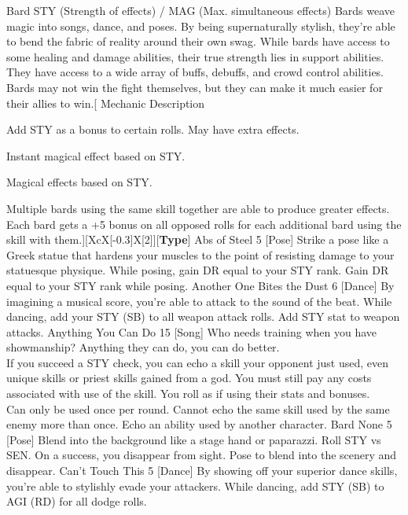 ﻿\begin{path}
{Bard}
{STY (Strength of effects) / MAG (Max. simultaneous effects)}
{Bards weave magic into songs, dance, and poses. By being supernaturally stylish, they're able to bend the fabric of reality around their own swag.}
{While bards have access to some healing and damage abilities, their true strength lies in support abilities. They have access to a wide array of buffs, debuffs, and crowd control abilities. Bards may not win the fight themselves, but they can make it much easier for their allies to win.}[
Mechanic Description
\begin{wldescription}
\item [Dance:]  Add STY as a bonus to certain rolls. May have extra effects.
\item [Pose:]  Instant magical effect based on STY.
\item [Song:]  Magical effects based on STY.
\end{wldescription}
Multiple bards using the same skill together are able to produce greater effects. Each bard gets a +5 bonus on all opposed rolls for each additional bard using the skill with them.][XcX[-0.3]X[2]][\textbf{Type}]
\skilldescription
{Abs of Steel}
{5}
[Pose]
{Strike a pose like a Greek statue that hardens your muscles to the point of resisting damage to your statuesque physique. While posing, gain DR equal to your STY rank.}
{Gain DR equal to your STY rank while posing.}
\skilldescription
{Another One Bites the Dust}
{6}
[Dance]
{By imagining a musical score, you're able to attack to the sound of the beat. While dancing, add your STY (SB) to all weapon attack rolls.}
{Add STY stat to weapon attacks.}
\skilldescription
{Anything You Can Do}
{15}
[Song]
{Who needs training when you have showmanship? Anything they can do, you can do better.
\\If you succeed a STY check, you can echo a skill your opponent just used, even unique skills or priest skills gained from a god. You must still pay any costs associated with use of the skill. You roll as if using their stats and bonuses.
\\Can only be used once per round. Cannot echo the same skill used by the same enemy more than once.}
{Echo an ability used by another character.}
\skilldescription
{Bard None}
{5}
[Pose]
{Blend into the background like a stage hand or paparazzi. Roll STY vs SEN. On a success, you disappear from sight.}
{Pose to blend into the scenery and disappear.}
\skilldescription
{Can't Touch This}
{5}
[Dance]
{By showing off your superior dance skills, you're able to stylishly evade your attackers. While dancing, add STY (SB) to AGI (RD) for all dodge rolls.}

\end{path}
